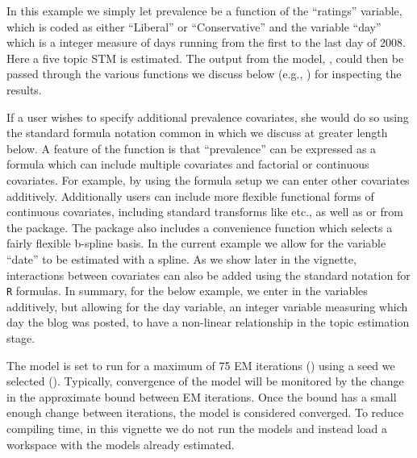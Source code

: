 \documentclass[nojss]{jss}
\begin{document}
In this example we simply let prevalence be a function of the ``ratings'' variable, which is coded as either ``Liberal'' or ``Conservative'' and the variable ``day'' which is a integer measure of days running from the first to the last day of 2008. Here a five topic STM is estimated. The output from the model, , could then be passed through the various functions we discuss below (e.g., ) for inspecting the results.

If a user wishes to specify additional prevalence covariates, she would do so using the standard formula notation common in  which we discuss at greater length below. A feature of the  function is that ``prevalence'' can be expressed as a formula which can include multiple covariates and factorial or continuous covariates.  For example, by using the formula setup we can enter other covariates additively. Additionally users can include more flexible functional forms of continuous covariates, including standard transforms like  etc., as well as  or  from the  package. The  package also includes a convenience function  which selects a fairly flexible b-spline basis. In the current example we allow for the variable ``date'' to be estimated with a spline. As we show later in the vignette, interactions between covariates can also be added using the standard notation for \texttt{R} formulas. In summary, for the below example, we enter in the variables additively, but allowing for the day variable, an integer variable measuring which day the blog was posted, to have a non-linear relationship in the topic estimation stage.

\begin{Schunk}
\end{Schunk}

The model is set to run for a maximum of 75 EM iterations () using a seed we selected ().  Typically, convergence of the model will be monitored by the change in the approximate bound between EM iterations.  Once the bound has a small enough change between iterations, the model is considered converged. To reduce compiling time, in this vignette we do not run the models and instead load a workspace with the models already estimated.
\end{document}
